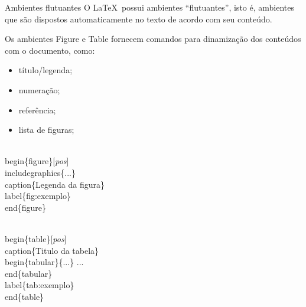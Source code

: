 \begin{frame}{Ambientes flutuantes}
    O \LaTeX\ possui ambientes ``flutuantes'', isto é, ambientes que são dispostos automaticamente no texto de acordo com seu conteúdo.
    
    Os ambientes Figure e Table fornecem comandos para dinamização dos conteúdos com o documento, como:
    
    \begin{itemize}
    \item título/legenda;
    \item numeração;
    \item referência;
    \item lista de figuras;
    \end{itemize}
    
    \begin{example}
        \begin{semiverbatim}
\\begin\{figure\}[\textit{pos}]
  \\includegraphics\{...\}
  \\caption\{Legenda da figura\}
  \\label\{fig:exemplo\}
\\end\{figure\}

\\begin\{table\}[\textit{pos}]
  \\caption\{Titulo da tabela\}
  \\begin\{tabular\}\{...\}
  ...
  \\end\{tabular\}
  \\label\{tab:exemplo\}
\\end\{table\}
\end{semiverbatim}
    \end{example}
\end{frame}


